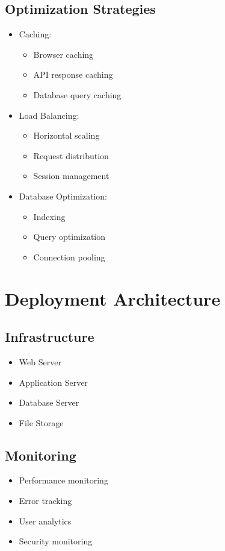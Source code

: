 \subsection{Optimization Strategies}
\begin{itemize}
    \item Caching:
    \begin{itemize}
        \item Browser caching
        \item API response caching
        \item Database query caching
    \end{itemize}
    \item Load Balancing:
    \begin{itemize}
        \item Horizontal scaling
        \item Request distribution
        \item Session management
    \end{itemize}
    \item Database Optimization:
    \begin{itemize}
        \item Indexing
        \item Query optimization
        \item Connection pooling
    \end{itemize}
\end{itemize}

\section{Deployment Architecture}
\subsection{Infrastructure}
\begin{itemize}
    \item Web Server
    \item Application Server
    \item Database Server
    \item File Storage
\end{itemize}

\subsection{Monitoring}
\begin{itemize}
    \item Performance monitoring
    \item Error tracking
    \item User analytics
    \item Security monitoring
\end{itemize}
